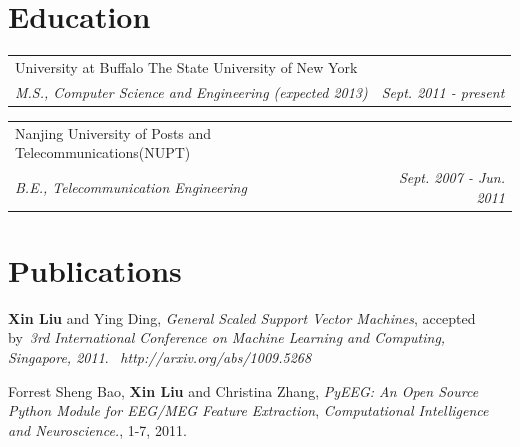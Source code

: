 \documentclass[letterpaper, 10pt]{article}
\makeatletter
\renewenvironment{itemize}{
  \begin{list}{}{
    \setlength{\leftmargin}{1.5em}
  }
}{
  \end{list}
}
\newcommand{\ressubheading}[4]{
\begin{tabular*}{6.6in}{l@{\extracolsep{\fill}}r}
		#1 & #2 \\
		\textit{#3} & \textit{#4} \\
\end{tabular*}\vspace{-6pt}}
\makeatother
\begin{document}
\section*{Education}
\begin{itemize}
	\item
	\ressubheading{University at Buffalo The State University of New York}{}{M.S., Computer Science and Engineering (expected 2013)}
	{Sept. 2011 - present}
	
	\item
	\ressubheading{Nanjing University of Posts and Telecommunications(NUPT)}{}{B.E., Telecommunication Engineering}
	{Sept. 2007 - Jun. 2011}
\end{itemize}


\vspace{-0.5cm}
\section*{Publications}
\begin{itemize}
\item \textbf{Xin Liu} and Ying Ding, \textit{General Scaled Support Vector Machines}, accepted by~\textit{3rd International Conference on 
Machine Learning and Computing, Singapore, 2011}. ~\textit{http://arxiv.org/abs/1009.5268}
\item Forrest Sheng Bao, \textbf{Xin Liu} and Christina Zhang, \textit{PyEEG: An Open Source Python Module for EEG/MEG Feature Extraction}, 
\textit{Computational Intelligence and Neuroscience.}, 1-7, 2011.
\end{itemize}
\end{document}
